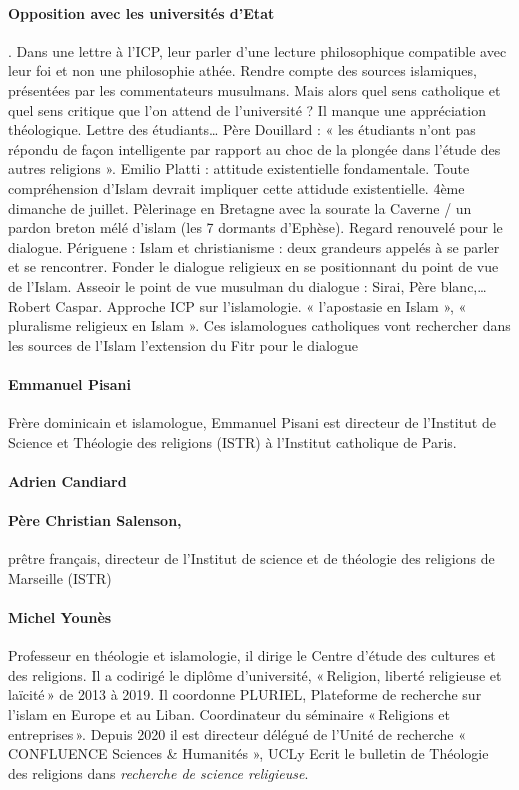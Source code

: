 \paragraph{Opposition avec les universités d’Etat}. Dans une lettre à l’ICP, leur parler d’une lecture philosophique compatible avec leur foi et non une philosophie athée. Rendre compte des sources islamiques, présentées par les commentateurs musulmans. Mais alors quel sens catholique et quel sens critique que l’on attend de l’université ? Il manque une appréciation théologique. Lettre des étudiants… Père Douillard : « les étudiants n’ont pas répondu de façon intelligente par rapport au choc de la plongée dans l’étude des autres religions ». Emilio Platti : attitude existentielle fondamentale. Toute compréhension d’Islam devrait impliquer cette attidude existentielle. 
 4ème dimanche de juillet. Pèlerinage en Bretagne avec la sourate la Caverne / un pardon breton mélé d’islam (les 7 dormants d’Ephèse). Regard renouvelé pour le dialogue. Périguene : Islam et christianisme : deux grandeurs appelés à se parler et se rencontrer.   Fonder le dialogue religieux en se positionnant du point de vue de l’Islam. Asseoir le point de vue musulman du dialogue : Sirai, Père blanc,… Robert Caspar. Approche ICP sur l’islamologie. « l’apostasie en Islam », « pluralisme religieux en Islam ». Ces islamologues catholiques vont rechercher dans les sources de l’Islam l’extension du Fitr pour le dialogue 

\paragraph{Emmanuel Pisani}
Frère dominicain et islamologue, Emmanuel Pisani est directeur de l’Institut de Science et Théologie des religions (ISTR) à l’Institut catholique de Paris.

\paragraph{Adrien Candiard}

\paragraph{Père Christian Salenson,} prêtre français, directeur de l’Institut de science et de théologie des religions de Marseille (ISTR)


\paragraph{Michel Younès}
Professeur en théologie et islamologie, il dirige le Centre d’étude des cultures et des religions. Il a codirigé le diplôme d’université, « Religion, liberté religieuse et laïcité » de 2013 à 2019. Il coordonne PLURIEL, Plateforme de recherche sur l’islam en Europe et au Liban. Coordinateur du séminaire « Religions et entreprises ».
Depuis 2020 il est directeur délégué de l’Unité de recherche « CONFLUENCE Sciences \& Humanités », UCLy
Ecrit le bulletin de Théologie des religions dans \textit{recherche de science religieuse}.

